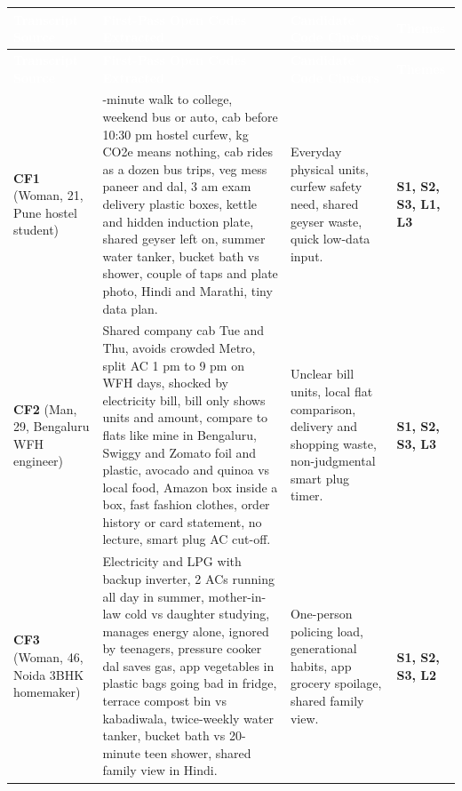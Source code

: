 \documentclass[12pt, a4paper]{article}
\begin{document}
\begin{longtable}{|>{\raggedright\arraybackslash}p{3.0cm}|>{\raggedright\arraybackslash}p{7.1cm}|>{\raggedright\arraybackslash}p{3.7cm}|>{\raggedright\arraybackslash}p{1.9cm}|}
\hline
\rowcolor{cNavy}
\textcolor{white}{\textbf{Transcript Source}} & \textcolor{white}{\textbf{First-Pass Open Codes Extracted}} & \textcolor{white}{\textbf{Candidate Code Clusters}} & \textcolor{white}{\textbf{Themes}} \\
\hline
\endfirsthead
\hline
\rowcolor{cNavy}
\textcolor{white}{\textbf{Transcript Source}} & \textcolor{white}{\textbf{First-Pass Open Codes Extracted}} & \textcolor{white}{\textbf{Candidate Code Clusters}} & \textcolor{white}{\textbf{Themes}} \\
\hline
\endhead
\hline
\endfoot

\textbf{CF1} \cite{cf1} (Woman, 21, Pune hostel student) & 
15-minute walk to college, weekend bus or auto, cab before 10:30 pm hostel curfew, kg CO2e means nothing, cab rides as a dozen bus trips, veg mess paneer and dal, 3 am exam delivery plastic boxes, kettle and hidden induction plate, shared geyser left on, summer water tanker, bucket bath vs shower, couple of taps and plate photo, Hindi and Marathi, tiny data plan. & 
Everyday physical units, curfew safety need, shared geyser waste, quick low-data input. & 
\textbf{S1, S2, S3, L1, L3} \\
\hline

\textbf{CF2} \cite{cf2} (Man, 29, Bengaluru WFH engineer) & 
Shared company cab Tue and Thu, avoids crowded Metro, split AC 1 pm to 9 pm on WFH days, shocked by electricity bill, bill only shows units and amount, compare to flats like mine in Bengaluru, Swiggy and Zomato foil and plastic, avocado and quinoa vs local food, Amazon box inside a box, fast fashion clothes, order history or card statement, no lecture, smart plug AC cut-off. & 
Unclear bill units, local flat comparison, delivery and shopping waste, non-judgmental smart plug timer. & 
\textbf{S1, S2, S3, L3} \\
\hline

\textbf{CF3} \cite{cf3} (Woman, 46, Noida 3BHK homemaker) & 
Electricity and LPG with backup inverter, 2 ACs running all day in summer, mother-in-law cold vs daughter studying, manages energy alone, ignored by teenagers, pressure cooker dal saves gas, app vegetables in plastic bags going bad in fridge, terrace compost bin vs kabadiwala, twice-weekly water tanker, bucket bath vs 20-minute teen shower, shared family view in Hindi. & 
One-person policing load, generational habits, app grocery spoilage, shared family view. & 
\textbf{S1, S2, S3, L2} \\
\hline


\end{longtable}
\end{document}
